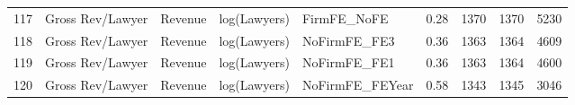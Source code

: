 \begin{table}[ht]
\begin{tabular}{rllllllll}
  117 & Gross Rev/Lawyer & Revenue & log(Lawyers) & FirmFE\_NoFE & 0.28 & 1370 & 1370 & 5230 \\ 
  118 & Gross Rev/Lawyer & Revenue & log(Lawyers) & NoFirmFE\_FE3 & 0.36 & 1363 & 1364 & 4609 \\ 
  119 & Gross Rev/Lawyer & Revenue & log(Lawyers) & NoFirmFE\_FE1 & 0.36 & 1363 & 1364 & 4600 \\ 
  120 & Gross Rev/Lawyer & Revenue & log(Lawyers) & NoFirmFE\_FEYear & 0.58 & 1343 & 1345 & 3046 \\ 
   \hline
\end{tabular}
\end{table}
